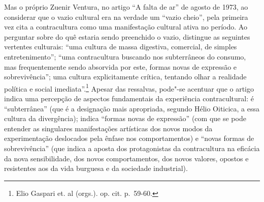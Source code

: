 Mas o próprio Zuenir Ventura, no artigo ``A falta de ar'' de agosto de
1973, ao considerar que o vazio cultural era na verdade um ``vazio
cheio'', pela primeira vez cita a contracultura como uma manifestação
cultural ativa no período. Ao perguntar sobre do quê estaria sendo
preenchido o vazio, distingue as seguintes vertentes culturais: ``uma
cultura de massa digestiva, comercial, de simples entretenimento'';
``uma contracultura buscando nos subterrâneos do consumo, mas
frequentemente sendo absorvida por este, formas novas de expressão e
sobrevivência''; uma cultura explicitamente crítica, tentando olhar a
realidade política e social imediata''.\footnote{Elio Gaspari et. al
  (orgs.). op. cit. p.~59-60.} Apesar das ressalvas, pode"-se
acentuar que o artigo indica uma percepção de aspectos fundamentais da
experiência contracultural: é ``subterrânea'' (que é a designação mais
apropriada, segundo Hélio Oiticica, a essa cultura da divergência);
indica ``formas novas de expressão'' (com que se pode entender as
singulares manifestações artísticas dos novos modos da experimentação
deslocados pela ênfase nos comportamentos) e ``novas formas de
sobrevivência'' (que indica a aposta dos protagonistas da contracultura
na eficácia da nova sensibilidade, dos novos comportamentos, dos novos
valores, opostos e resistentes aos da vida burguesa e da sociedade
industrial).

\asterisc

